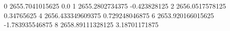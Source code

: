 0 2655.7041015625 0.0
1 2655.2802734375 -0.423828125
2 2656.0517578125 0.34765625
4 2656.433349609375 0.729248046875
6 2653.920166015625 -1.783935546875
8 2658.89111328125 3.18701171875
